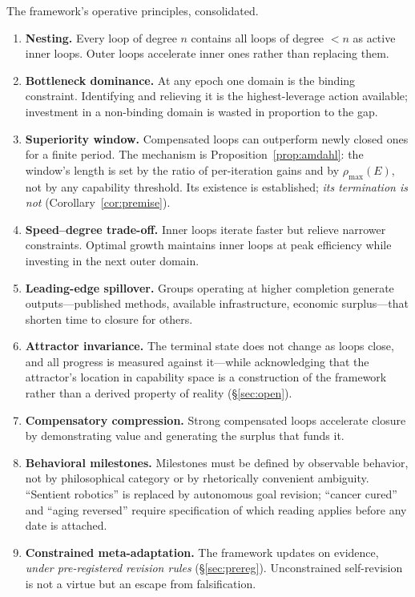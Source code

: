 \documentclass[11pt]{article}
\begin{document}
The framework's operative principles, consolidated.

\begin{enumerate}[label=\textbf{P\arabic*.},leftmargin=3.2em]
\item \textbf{Nesting.} Every loop of degree $n$ contains all loops of degree $<n$ as active inner loops. Outer loops accelerate inner ones rather than replacing them.
\item \textbf{Bottleneck dominance.} At any epoch one domain is the binding constraint. Identifying and relieving it is the highest-leverage action available; investment in a non-binding domain is wasted in proportion to the gap.
\item \textbf{Superiority window.} Compensated loops can outperform newly closed ones for a finite period. The mechanism is Proposition~\ref{prop:amdahl}: the window's length is set by the ratio of per-iteration gains and by $\rho_{\max}(E)$, not by any capability threshold. Its existence is established; \emph{its termination is not} (Corollary~\ref{cor:premise}).
\item \textbf{Speed--degree trade-off.} Inner loops iterate faster but relieve narrower constraints. Optimal growth maintains inner loops at peak efficiency while investing in the next outer domain.
\item \textbf{Leading-edge spillover.} Groups operating at higher completion generate outputs---published methods, available infrastructure, economic surplus---that shorten time to closure for others.
\item \textbf{Attractor invariance.} The terminal state does not change as loops close, and all progress is measured against it---while acknowledging that the attractor's location in capability space is a construction of the framework rather than a derived property of reality (\S\ref{sec:open}).
\item \textbf{Compensatory compression.} Strong compensated loops accelerate closure by demonstrating value and generating the surplus that funds it.
\item \textbf{Behavioral milestones.} Milestones must be defined by observable behavior, not by philosophical category or by rhetorically convenient ambiguity. ``Sentient robotics'' is replaced by autonomous goal revision; ``cancer cured'' and ``aging reversed'' require specification of which reading applies before any date is attached.
\item \textbf{Constrained meta-adaptation.} The framework updates on evidence, \emph{under pre-registered revision rules} (\S\ref{sec:prereg}). Unconstrained self-revision is not a virtue but an escape from falsification.

\end{enumerate}
\end{document}
